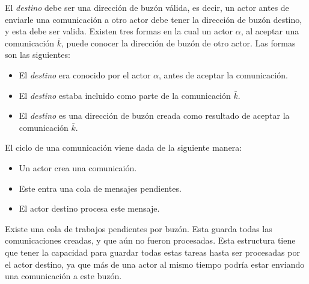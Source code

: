 El \textit{destino} debe ser una dirección de buzón válida, es decir, un actor antes de enviarle una comunicación a otro actor debe tener la dirección de buzón destino, y esta debe ser valida. Existen tres formas en la cual un actor $\alpha$, al aceptar una comunicación $\bar{k}$, puede conocer la dirección de buzón de otro actor. Las formas son las siguientes:

\begin{itemize}
 \item El \textit{destino} era conocido por el actor $\alpha$, antes de aceptar la comunicación.
 \item El \textit{destino} estaba incluido como parte de la comunicación $\bar{k}$.
 \item El \textit{destino} es una dirección de buzón creada como resultado de aceptar la comunicación $\bar{k}$.
\end{itemize}

El ciclo de una comunicación viene dada de la siguiente manera:

\begin{itemize}
 \item Un actor crea una comunicaión.
 \item Este entra una cola de mensajes pendientes.
 \item El actor destino procesa este mensaje.
\end{itemize}

Existe una cola de trabajos pendientes por buzón. Esta guarda todas las comunicaciones creadas, y que aún no fueron procesadas. Esta estructura tiene que tener la capacidad para guardar todas estas tareas hasta ser procesadas por el actor destino, ya que más de una actor al mismo tiempo podría estar enviando una comunicación a este buzón.



